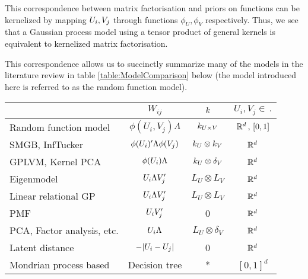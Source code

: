 This correspondence between matrix factorisation and priors on functions can be kernelized by mapping $U_i, V_j$ through functions $\phi_U, \phi_V$ respectively.
Thus, we see that a Gaussian process model using a tensor product of general kernels is equivalent to kernelized matrix factorisation.

This correspondence allows us to succinctly summarize many of the models in the literature review in table \ref{table:ModelComparison} below (the model introduced here is referred to as the random function model).
\begin{table}[h]
  \centering
  \begin{tabular}{l|ccc}%
    & $W_{ij}$ & $k$ & $U_i, V_j \in \, .$ \\%
    \midrule
    Random function model & $\phi(U_i, V_j)\Lambda$ & $k_{U\times V}$ & $\mathbb{R}^d \, , \, [0,1]$\\%
    SMGB, InfTucker & $\phi(U_i)'\Lambda\phi(V_j)$ & $k_U \otimes k_V$ & $\mathbb{R}^d$\\%
    GPLVM, Kernel PCA & $\phi(U_i)\Lambda$ & $k_U \otimes \delta_V$ & $\mathbb{R}^d$ \\%
    Eigenmodel & $U_i\Lambda V_j'$ & $L_U \otimes L_V$ & $\mathbb{R}^d$ \\%
    Linear relational GP & $U_i\Lambda V_j'$ & $L_U \otimes L_V$ & $\mathbb{R}^d$ \\%
    PMF & $U_i V_j'$ & 0 & $\mathbb{R}^d$ \\%
    PCA, Factor analysis, etc. & $U_i\Lambda$ & $L_U \otimes \delta_V$ & $\mathbb{R}^d$ \\%
    Latent distance & $-|U_i - U_j|$ & 0 & $\mathbb{R}^d$ \\%
    Mondrian process based & Decision tree & * & $[0, 1]^d$ \\%

\end{tabular}
\end{table}
